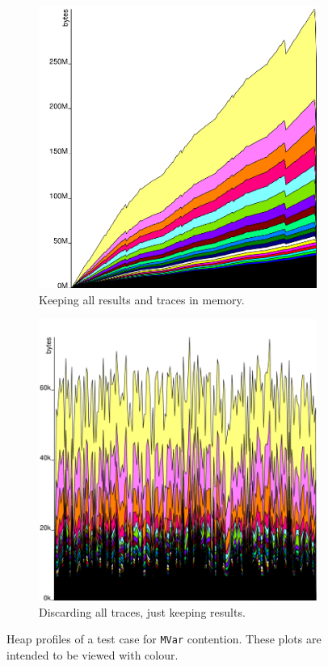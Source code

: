 \begin{figure}
  \centering
  \begin{subfigure}{0.49\textwidth}
    \centering
    \includegraphics[width=\textwidth]{fig/nodiscard.png}
    \caption{Keeping all results and traces in memory.}
  \end{subfigure}
  \begin{subfigure}{0.49\textwidth}
    \centering
    \includegraphics[width=\textwidth]{fig/discard.png}
    \caption{Discarding all traces, just keeping results.}
  \end{subfigure}
  \caption[Heap profiles of a test case for \texttt{MVar} contention.]{Heap profiles of a test case for \texttt{MVar} contention.  These plots are intended to be viewed with colour.}\label{fig:discard}
\end{figure}

